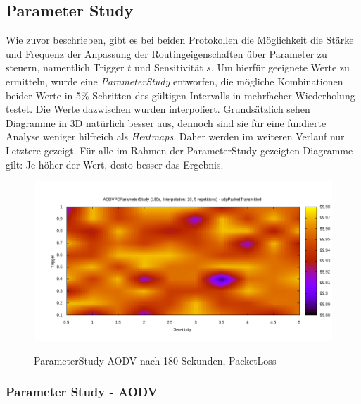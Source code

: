 \subsection{Parameter Study}
\label{chapter:auswertung:study}

Wie zuvor beschrieben, gibt es bei beiden Protokollen die Möglichkeit die Stärke und Frequenz der Anpassung der Routingeigenschaften über Parameter zu steuern, namentlich Trigger $t$ und Sensitivität $s$. Um hierfür geeignete Werte zu ermitteln, wurde eine \textit{ParameterStudy} entworfen, die mögliche Kombinationen beider Werte in 5\% Schritten des gültigen Intervalls in mehrfacher Wiederholung testet. Die Werte dazwischen wurden interpoliert. Grundsätzlich sehen Diagramme in 3D natürlich besser aus, dennoch sind sie für eine fundierte Analyse weniger hilfreich als \textit{Heatmaps}. Daher werden im weiteren Verlauf nur Letztere gezeigt. Für alle im Rahmen der ParameterStudy gezeigten Diagramme gilt: Je höher der Wert, desto besser das Ergebnis.


\begin{figure}
  \centering
  \includegraphics[scale=0.55]{bilder/aps2.png} \\
  \caption{ParameterStudy AODV nach 180 Sekunden, PacketLoss}
  \label{image:omnet:aodv:two}
\end{figure}

\subsubsection{Parameter Study - AODV}
\label{chapter:auswertung:studyaodv}

